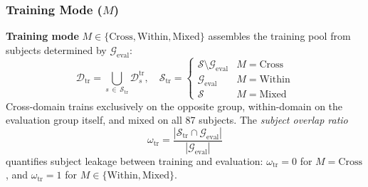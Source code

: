 \documentclass[lettersize,journal]{IEEEtran}
\begin{document}
\subsubsection{Training Mode ($M$)}\label{sec:training_mode}
\textbf{Training mode} $M \in \{\mathrm{Cross}, \mathrm{Within}, \mathrm{Mixed}\}$ assembles the training pool from subjects determined by $\mathcal{G}_{\mathrm{eval}}$:
\begin{equation}
\label{eq:train_pool}
\mathcal{D}_{\mathrm{tr}} = \bigcup_{s \,\in\, \mathcal{S}_{\mathrm{tr}}} \mathcal{D}_s^{\mathrm{tr}}, \quad
\mathcal{S}_{\mathrm{tr}} =
\begin{cases}
\mathcal{S} \setminus \mathcal{G}_{\mathrm{eval}} & M = \mathrm{Cross} \\
\mathcal{G}_{\mathrm{eval}}                       & M = \mathrm{Within} \\
\mathcal{S}                                       & M = \mathrm{Mixed}
\end{cases}
\end{equation}
Cross-domain trains exclusively on the opposite group, within-domain on the evaluation group itself, and mixed on all 87 subjects.
The \emph{subject overlap ratio}
\begin{equation}
\label{eq:overlap}
\omega_{\mathrm{tr}} = \frac{|\mathcal{S}_{\mathrm{tr}} \cap \mathcal{G}_{\mathrm{eval}}|}{|\mathcal{G}_{\mathrm{eval}}|}
\end{equation}
quantifies subject leakage between training and evaluation: $\omega_{\mathrm{tr}} = 0$ for $M = \mathrm{Cross}$, and $\omega_{\mathrm{tr}} = 1$ for $M \in \{\mathrm{Within}, \mathrm{Mixed}\}$.
\end{document}
